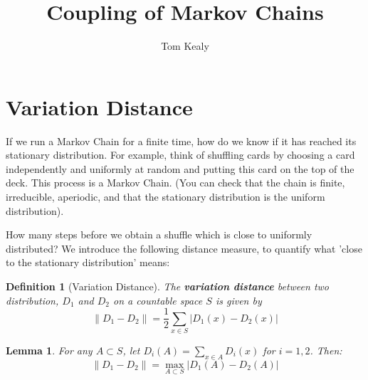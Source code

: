 \documentclass[11pt]{article}
\newcommand{\norm}[1]{\left\lVert#1\right\rVert}
\newtheorem{lem}{Lemma}[section]
\newtheorem{definition}{Definition}[section]
\begin{document}
\title{Coupling of Markov Chains}
\author{Tom Kealy}

\section{Variation Distance}
If we run a Markov Chain for a finite time, how do we know if it has reached its stationary distribution. For example, think of shuffling cards by choosing a card independently and uniformly at random and putting this card on the top of the deck. This process is a Markov Chain. (You can check that the chain is finite, irreducible, aperiodic, and that the stationary distribution is the uniform distribution).

How many steps before we obtain a shuffle which is close to uniformly distributed? We introduce the following distance measure, to quantify what 'close to the stationary distribution' means:

\begin{definition}[Variation Distance]
The \textbf{variation distance} between two distribution, \(D_1\) and \(D_2\) on a countable space \(S\) is given by
\begin{equation}
\norm{D_1 - D_2} = \frac{1}{2} \sum_{x \in S} |D_1\left(x\right) - D_2\left(x\right)|
\end{equation}
\end{definition}

\begin{lem}
For any \(A \subset S\), let \(D_i\left(A\right) = \sum_{x\in A} D_i\left(x\right)\) for \(i=1,2\). Then:
\begin{equation}
\norm{D_1 - D_2} = \underset{A \subset S}{\operatorname{max}} |D_1\left(A\right) - D_2\left(A\right)|
\end{equation}
\label{vardistlemma}
\end{lem}
\end{document}
